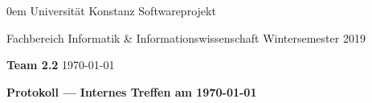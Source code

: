 \documentclass[11pt]{article} %
\newcommand{\names}{Team 2.2}
\begin{document}
\thispagestyle{plain}
{\footnotesize \parindent0em
    {\sc Universität Konstanz} \hfill {\sc Softwareprojekt}\par
    {\sc Fachbereich Informatik \& Informationswissenschaft} \hfill Wintersemester 2019 \par
    \textbf{\names} \hfill \today\par
    \begin{center}
      {\Large\bf Protokoll --- Internes Treffen am \today}
    \end{center}}
\end{document}
